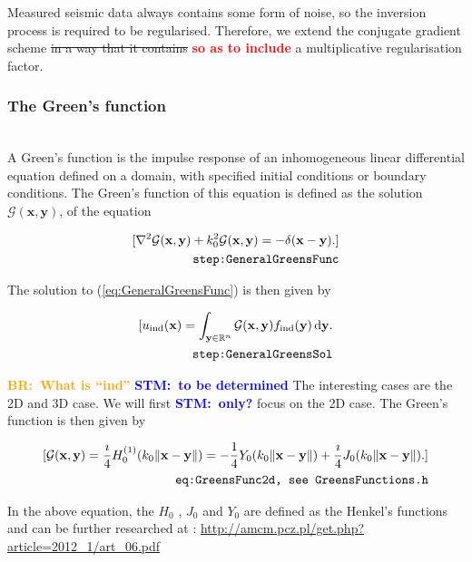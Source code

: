 \documentclass[10pt,a4paper]{article}
\newcommand{\df}[1]{\, \ensuremath{\mbox{d}#1}}
\newcommand{\commentstm}[1]{\textcolor{blue}{\textbf{STM:\ #1}}}
\newcommand{\newstm}[1]{\textcolor{red}{\textbf{#1}}}
\newcommand{\oldstm}[1]{\sout{#1}}
\newcommand{\oldstmtwo}[1]{\xout{#1}}
\newcommand{\commentbr}[1]{\textcolor{orange}{\textbf{BR:\ #1}}}
\begin{document}
Measured seismic data always contains some form of noise, so the
inversion process is required to be regularised. Therefore, we extend
the conjugate gradient scheme \oldstm{in a way that it contains}
\newstm{so as to include} a multiplicative regularisation factor.

\subsubsection{The Green's function}
\oldstmtwo{\textbf{2.1. The Green's function}}\\
A Green's function is the impulse response of an inhomogeneous linear
differential equation defined on a domain, with specified initial
conditions or boundary conditions.
The Green's function of this equation is defined as the solution
$\mathcal{G}(\mathbf{x}, \mathbf{y})$, of the equation

\begin{align}
\label{eq:GeneralGreensFunc}
[ \nabla^2 \mathcal{G}(\mathbf{x}, \mathbf{y}) + k_0^2
\mathcal{G}(\mathbf{x}, \mathbf{y}) = -\delta(\mathbf{x} -
\mathbf{y}). ]\\
\tag*{\texttt{step:GeneralGreensFunc}}
\end{align}

The solution to (\ref{eq:GeneralGreensFunc}) is then given by

\begin{align} \label{eq:GeneralGreensSol}
[ u_\text{ind}(\mathbf{x}) =
\int_{\mathbf{y} \in \mathbb{R}^n} \mathcal{G}(\mathbf{x}, \mathbf{y})
f_\text{ind}(\mathbf{y}) \df{\mathbf{y}}.\\
\tag*{\texttt{step:GeneralGreensSol}}
\end{align}

\commentbr{What is ``ind''}
\commentstm{to be determined}
The interesting cases are the 2D and 3D case. We will first
\commentstm{only?} focus on the 2D case. The Green's function is then
given by

\begin{align} \label{eq:GreensFunc2d}[ \mathcal{G}(\mathbf{x}, \mathbf{y}) =
\frac{\imath}{4} H_0^{(1)}(k_0 \|\mathbf{x} - \mathbf{y}\|) =
-\frac{1}{4} Y_0(k_0 \|\mathbf{x} - \mathbf{y}\|) + \frac{\imath}{4}
J_0(k_0 \|\mathbf{x} - \mathbf{y}\|).  ]\\
\tag*{\texttt{eq:GreensFunc2d, see GreensFunctions.h}}
\end{align}

In the above equation, the $H_0$ , $J_0$ and $Y_0$ are defined as the
Henkel's functions and can be further researched at :
\url{http://amcm.pcz.pl/get.php?article=2012_1/art_06.pdf}
\end{document}
